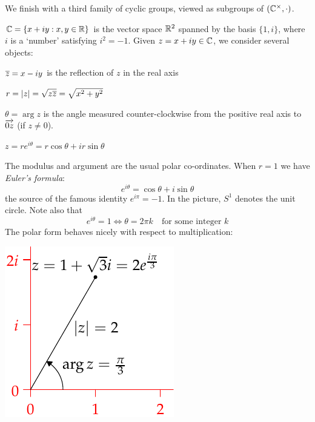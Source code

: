 
We finish with a third family of cyclic groups, viewed as subgroups of $(\mathbb{C}^\times,\cdot)$.

\begin{aside}
\qquad  $\mathbb{C}=\{x+iy:x,y\in\mathbb{R}\}$ is the vector space $\mathbb{R}^2$ spanned by the basis $\{1,i\}$, where $i$ is a `number' satisfying $i^2=-1$. 
Given $z=x+iy\in\mathbb{C}$, we consider several objects:\par
\begin{minipage}[t]{0.7\textwidth}\vspace{-8pt}
\begin{description}\itemsep0pt
\item[\normalfont\emph{Complex conjugate}:] $\overline{z}=x-iy$ is the reflection of $z$ in the real axis
\item[\normalfont\emph{Modulus (length)}:] $r=\left| z\right|=\sqrt{z\overline{z}}=\sqrt{x^2+y^2}$
\item[\normalfont\emph{Argument (angle)}:] $\theta=\arg z$ is the angle measured counter-clockwise from the positive real axis to $\overrightarrow{0z}$ (if $z\neq 0$).
\item[\normalfont\emph{Polar form}:] $z=re^{i\theta} =r\cos\theta+ir\sin\theta$
\end{description}\vspace{-7pt}
The modulus and argument are the usual polar co-ordinates. When $r=1$ we have \emph{Euler's formula}:\footnotemark\vspace{-2pt}
\[e^{i\theta}=\cos\theta+i\sin\theta\]
the source of the famous identity $\displaystyle e^{i\pi}=-1$. In the picture, $S^1$ denotes the unit circle. Note also that\vspace{-2pt}
\[e^{i\theta}=1\iff \theta=2\pi k\quad\text{for some integer $k$}\tag{$\dag$}\]
The polar form behaves nicely with respect to multiplication:\vspace{-2pt}
\end{minipage}
\begin{minipage}[t]{0.29\textwidth}\vspace{-5pt}
\flushright\includegraphics[scale=0.9]{cyclic-polar}\\

\end{minipage}
\end{aside}
